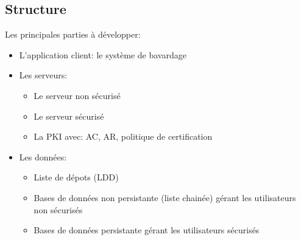\documentclass[a4paper,11pt,french]{article}
\begin{document}
\subsection{Structure}
Les principales parties à développer:
\begin{itemize}
\item L'application client: le système de bavardage
\item Les serveurs:
\begin{itemize}
\item Le serveur non sécurisé
\item Le serveur sécurisé
\item La PKI avec: AC, AR, politique de certification
\end{itemize}
\item Les données:
\begin{itemize}
\item Liste de dépots (LDD)
\item Bases de données non persistante (liste chainée) gérant les utilisateurs non sécurisés
\item Bases de données persistante gérant les utilisateurs sécurisés
\end{itemize}
\end{itemize}
\end{document}
